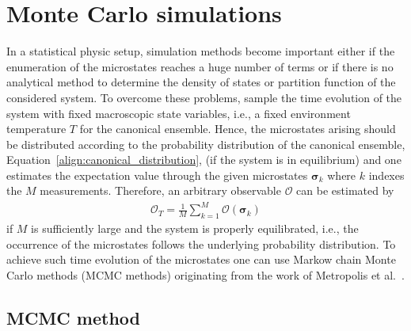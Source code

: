 \label{cha:methods}


\section{Monte Carlo simulations}
\label{sec:MCsimulations}

In a statistical physic setup, simulation methods become important either if the enumeration of the microstates reaches a huge number of terms or if there is no 
analytical method to determine the density of states or partition function of the considered system. To overcome these problems, 
sample the time evolution of the system  with fixed macroscopic state variables, i.e., a fixed environment temperature $T$ for the canonical ensemble. 
Hence, the microstates arising should be distributed according to the probability distribution of the canonical ensemble, Equation~\eqref{align:canonical_distribution}, 
(if the system is in equilibrium) and one estimates the expectation value through the given microstates $\bm{\sigma}_k$ where $k$ indexes the $M$ 
measurements. Therefore, an arbitrary observable $\mathcal{O}$ can be estimated by
\begin{align}
    \hat{\mathcal{O}}_T=\frac{1}{M}\sum_{k=1}^M\mathcal{O}(\bm{\sigma}_k)
    \label{align:MCidea}
\end{align}
if $M$ is sufficiently large and the system is properly equilibrated, i.e., the occurrence of the microstates follows the underlying probability 
distribution. To achieve such time evolution of the microstates one can use Markow chain Monte Carlo methods (MCMC methods) originating from the 
work of Metropolis et al.~\cite{Metropolis1953}.

\subsection*{MCMC method}

